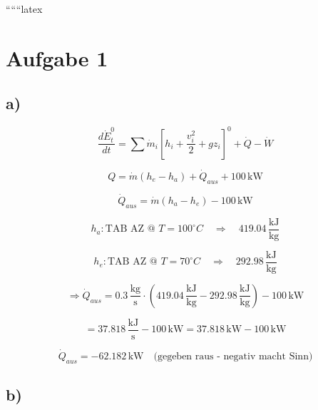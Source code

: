 
``````latex


\section*{Aufgabe 1}

\subsection*{a)}

\begin{equation*}
\frac{d\dot{E}_t^0}{dt} = \sum \dot{m}_i \left[ h_i + \frac{v_i^2}{2} + g z_i \right]^0 + \dot{Q} - \dot{W}
\end{equation*}

\begin{equation*}
Q = \dot{m} (h_e - h_a) + \dot{Q}_{aus} + 100 \, \text{kW}
\end{equation*}

\begin{equation*}
\dot{Q}_{aus} = \dot{m} (h_a - h_e) - 100 \, \text{kW}
\end{equation*}

\begin{equation*}
h_a: \text{TAB AZ @ } T = 100^\circ C \quad \Rightarrow \quad 419.04 \, \frac{\text{kJ}}{\text{kg}}
\end{equation*}

\begin{equation*}
h_e: \text{TAB AZ @ } T = 70^\circ C \quad \Rightarrow \quad 292.98 \, \frac{\text{kJ}}{\text{kg}}
\end{equation*}

\begin{equation*}
\Rightarrow \dot{Q}_{aus} = 0.3 \, \frac{\text{kg}}{\text{s}} \cdot (419.04 \, \frac{\text{kJ}}{\text{kg}} - 292.98 \, \frac{\text{kJ}}{\text{kg}}) - 100 \, \text{kW}
\end{equation*}

\begin{equation*}
= 37.818 \, \frac{\text{kJ}}{\text{s}} - 100 \, \text{kW} = 37.818 \, \text{kW} - 100 \, \text{kW}
\end{equation*}

\begin{equation*}
\dot{Q}_{aus} = -62.182 \, \text{kW} \quad \text{(gegeben raus - negativ macht Sinn)}
\end{equation*}

\subsection*{b)}

